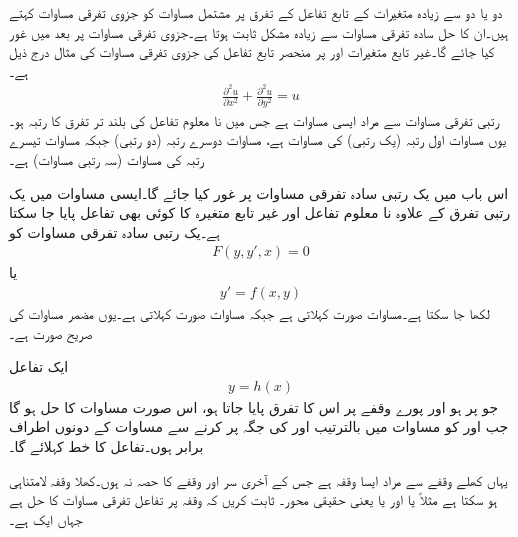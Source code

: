 دو یا دو سے زیادہ  متغیرات کے تابع تفاعل کے تفرق پر مشتمل مساوات کو جزوی تفرقی مساوات کہتے ہیں۔ان کا حل سادہ تفرقی مساوات  سے زیادہ مشکل ثابت ہوتا ہے۔جزوی تفرقی مساوات پر بعد میں غور کیا جائے گا۔غیر تابع متغیرات  اور  پر منحصر تابع تفاعل  کی جزوی تفرقی مساوات کی مثال درج ذیل ہے۔
\begin{align}
\frac{\partial^2 u}{\partial x^2}+\frac{\partial^2 u}{\partial y^2}=u
\end{align}
 رتبی تفرقی مساوات سے مراد ایسی مساوات ہے جس میں نا معلوم تفاعل  کی بلند تر تفرق کا رتبہ  ہو۔یوں مساوات  اول رتبہ (یک رتبی) کی مساوات ہے، مساوات  دوسرے رتبہ (دو رتبی)  جبکہ مساوات  تیسرے رتبہ  کی مساوات (سہ رتبی مساوات) ہے۔

اس باب میں یک رتبی سادہ تفرقی مساوات پر غور کیا جائے گا۔ایسی مساوات میں یک رتبی تفرق  کے علاوہ نا معلوم تفاعل  اور غیر تابع متغیرہ کا کوئی بھی تفاعل  پایا جا سکتا ہے۔یک رتبی سادہ تفرقی مساوات کو
\begin{align}\label{مساوات_سادہ_اول_درجہ_خفی}
F(y,y',x)=0
\end{align}
یا 
\begin{align}\label{مساوات_سادہ_اول_درجہ_صریح}
y'=f(x,y)
\end{align}
لکھا جا سکتا ہے۔مساوات    صورت کہلاتی ہے جبکہ مساوات   صورت کہلاتی ہے۔یوں مضمر مساوات کی صریح صورت  ہے۔

ایک تفاعل
\begin{align}
y=h(x)
\end{align}
جو   پر  ہو اور پورے وقفے پر اس کا تفرق پایا جاتا ہو، اس صورت مساوات  کا حل ہو گا جب  اور  کو  مساوات  میں بالترتیب  اور  کی جگہ پر کرنے سے مساوات کے دونوں اطراف برابر ہوں۔تفاعل  کا خط  کہلائے گا۔

یہاں کھلے وقفے سے مراد ایسا وقفہ ہے جس کے آخری سر  اور  وقفے کا حصہ نہ ہوں۔کھلا وقفہ لامتناہی ہو سکتا ہے مثلاً  یا  اور  یا  یعنی حقیقی محور۔
ثابت کریں کہ وقفہ  پر تفاعل  تفرقی مساوات  کا حل ہے جہاں  ایک  ہے۔

